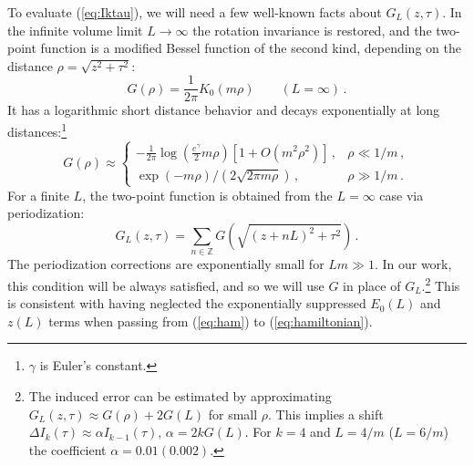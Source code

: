 \documentclass[11pt]{article}
\newcommand{\reef}[1]{(\ref{#1})}
\def\bZ {\mathbb{Z}}
\def\bZ {\mathbb{Z}}
\numberwithin{equation}{section}
\begin{document}
To evaluate \reef{eq:Iktau}, we will need a few well-known facts about $G_L(z,\tau)$. In the infinite volume limit $L\to\infty$ the rotation invariance is restored, and the two-point function is a modified Bessel function of the second kind, depending on the distance $\rho=\sqrt{z^2+\tau^2}$:
%
\begin{equation}
\label{eq:prop}
G(\rho) = \frac{1}{2 \pi} K_0(m \rho)\qquad(L=\infty)\,.
\end{equation}
%
It has a logarithmic short distance behavior and decays exponentially at long distances:\footnote{$\gamma$ is Euler's constant.}
\begin{equation}
\label{eq:asym2pf}
G(\rho) \approx \begin{cases}
\displaystyle - \frac{1}{2 \pi} \log\left(\frac{e^{\gamma}}{2}  m\rho\right)[1 + O(m^2 \rho^2)]\,,  & \rho \ll 1/m\,,\\
\exp(-m\rho)/(2\sqrt{2\pi m \rho})\,, & \rho\gg 1/m\,.
\end{cases}
\end{equation}
For a finite $L$, the two-point function is obtained from the $L=\infty$ case via periodization:
\begin{equation}
G_L(z,\tau)=\sum_{n\in \bZ} G(\sqrt{(z+n L)^2+\tau^2})\,.
\end{equation}
The periodization corrections are exponentially small for $Lm\gg 1$. In our work, this condition will be always satisfied, and so we will use $G$ in place of $G_L$.\footnote{The induced error can be estimated by approximating $G_L(z,\tau)\approx G(\rho)+2G(L)$ for small $\rho$. This implies a shift $\Delta I_k(\tau)\approx \alpha I_{k-1}(\tau)$, $\alpha=2 k G(L)$. For $k=4$ and $L=4/m$ ($L=6/m$) the coefficient $\alpha=0.01 (0.002)$.} This is consistent with having neglected the exponentially suppressed $E_0(L)$ and $z(L)$ terms when passing from \reef{eq:ham} to \reef{eq:hamiltonian}.
\end{document}
